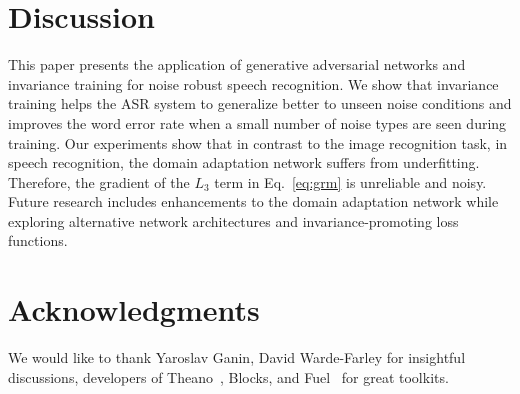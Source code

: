 \documentclass[a4paper]{article}
\begin{document}
\section{Discussion}
\label{sec:discussion}
    This paper presents the application of generative adversarial networks and 
    invariance training for noise robust speech recognition. We show that invariance training 
    helps the ASR system to generalize better to unseen noise conditions and improves 
    the word error rate when a small number of noise types are seen during training. Our 
    experiments show that in contrast to the image recognition task, in speech 
    recognition, the domain adaptation network suffers from underfitting. Therefore, the 
    gradient of the $L_3$ term in Eq.~\ref{eq:grm} is unreliable and noisy. Future 
    research includes enhancements to the domain adaptation network while exploring 
    alternative network architectures and invariance-promoting loss functions.

\section{Acknowledgments}

We would like to thank Yaroslav Ganin, David Warde-Farley for insightful discussions,
developers of Theano~\citep{theano2016theano}, Blocks, and Fuel~\citep{MerrienboerBDSW15} 
for great toolkits.




\end{document}
